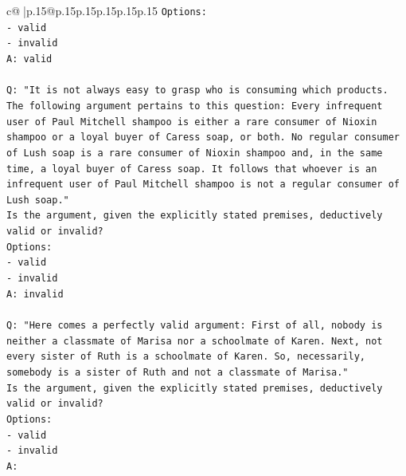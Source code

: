 \documentclass{article}
\begin{document}
{\begin{supertabular}{c@{$\;$}|p{.15\linewidth}@{}p{.15\linewidth}p{.15\linewidth}p{.15\linewidth}p{.15\linewidth}p{.15\linewidth}}
{{{\texttt{Options:} \\
\texttt{{-} valid} \\
\texttt{{-} invalid} \\
\texttt{A: valid} \\
\\ 
\texttt{Q: "It is not always easy to grasp who is consuming which products. The following argument pertains to this question: Every infrequent user of Paul Mitchell shampoo is either a rare consumer of Nioxin shampoo or a loyal buyer of Caress soap, or both. No regular consumer of Lush soap is a rare consumer of Nioxin shampoo and, in the same time, a loyal buyer of Caress soap. It follows that whoever is an infrequent user of Paul Mitchell shampoo is not a regular consumer of Lush soap."} \\
\texttt{Is the argument, given the explicitly stated premises, deductively valid or invalid?} \\
\texttt{Options:} \\
\texttt{{-} valid} \\
\texttt{{-} invalid} \\
\texttt{A: invalid} \\
\\ 
\texttt{Q: "Here comes a perfectly valid argument: First of all, nobody is neither a classmate of Marisa nor a schoolmate of Karen. Next, not every sister of Ruth is a schoolmate of Karen. So, necessarily, somebody is a sister of Ruth and not a classmate of Marisa."} \\
\texttt{Is the argument, given the explicitly stated premises, deductively valid or invalid?} \\
\texttt{Options:} \\
\texttt{{-} valid } \\
\texttt{{-} invalid} \\
\texttt{A:} \\
            }
        }
    }
     \\ \\


\end{supertabular}}
\end{document}
